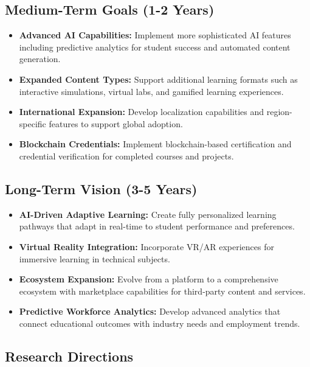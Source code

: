 \documentclass[12pt,a4paper]{report}
\begin{document}
\subsection{Medium-Term Goals (1-2 Years)}

\begin{itemize}
    \item \textbf{Advanced AI Capabilities:} Implement more sophisticated AI features including predictive analytics for student success and automated content generation.

    \item \textbf{Expanded Content Types:} Support additional learning formats such as interactive simulations, virtual labs, and gamified learning experiences.

    \item \textbf{International Expansion:} Develop localization capabilities and region-specific features to support global adoption.

    \item \textbf{Blockchain Credentials:} Implement blockchain-based certification and credential verification for completed courses and projects.
\end{itemize}

\subsection{Long-Term Vision (3-5 Years)}

\begin{itemize}
    \item \textbf{AI-Driven Adaptive Learning:} Create fully personalized learning pathways that adapt in real-time to student performance and preferences.

    \item \textbf{Virtual Reality Integration:} Incorporate VR/AR experiences for immersive learning in technical subjects.

    \item \textbf{Ecosystem Expansion:} Evolve from a platform to a comprehensive ecosystem with marketplace capabilities for third-party content and services.

    \item \textbf{Predictive Workforce Analytics:} Develop advanced analytics that connect educational outcomes with industry needs and employment trends.
\end{itemize}

\subsection{Research Directions}
\end{document}
